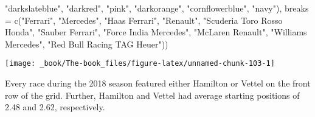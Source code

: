 \documentclass[
]{book}
\newenvironment{Shaded}{\begin{snugshade}}{\end{snugshade}}
\newcommand{\AttributeTok}[1]{\textcolor[rgb]{0.77,0.63,0.00}{#1}}
\newcommand{\FunctionTok}[1]{\textcolor[rgb]{0.00,0.00,0.00}{#1}}
\newcommand{\NormalTok}[1]{#1}
\newcommand{\StringTok}[1]{\textcolor[rgb]{0.31,0.60,0.02}{#1}}
\begin{document}
\begin{Shaded}
\begin{Highlighting}[]
                               \StringTok{"darkslateblue"}\NormalTok{, }
                                \StringTok{"darkred"}\NormalTok{,  }
                                \StringTok{"pink"}\NormalTok{, }
                                \StringTok{"darkorange"}\NormalTok{, }
                                \StringTok{"cornflowerblue"}\NormalTok{,}
                               \StringTok{"navy"}\NormalTok{),}
                     \AttributeTok{breaks =} \FunctionTok{c}\NormalTok{(}\StringTok{"Ferrari"}\NormalTok{,}
                                 \StringTok{"Mercedes"}\NormalTok{,}
                                 \StringTok{"Haas Ferrari"}\NormalTok{,}
                                 \StringTok{"Renault"}\NormalTok{,}
                                 \StringTok{"Scuderia Toro Rosso Honda"}\NormalTok{,}
                                 \StringTok{"Sauber Ferrari"}\NormalTok{, }
                                 \StringTok{"Force India Mercedes"}\NormalTok{,}
                                 \StringTok{"McLaren Renault"}\NormalTok{,}
                                 \StringTok{"Williams Mercedes"}\NormalTok{,}
                                 \StringTok{"Red Bull Racing TAG Heuer"}\NormalTok{))}
\end{Highlighting}
\end{Shaded}

\begin{center}\texttt{[image: \_book/The-book\_files/figure-latex/unnamed-chunk-103-1]} \end{center}

Every race during the 2018 season featured either Hamilton or Vettel on the front row of the grid. Further, Hamilton and Vettel had average starting positions of 2.48 and 2.62, respectively.
\end{document}
